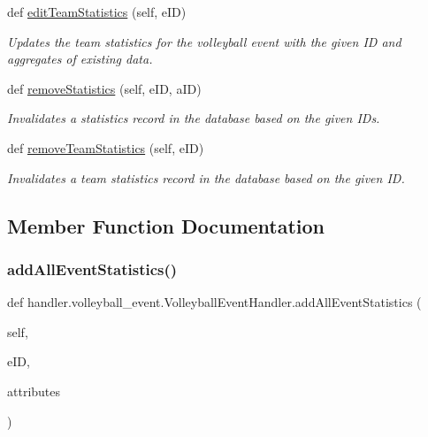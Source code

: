 \begin{DoxyCompactItemize}
def \hyperlink{classhandler_1_1volleyball__event_1_1_volleyball_event_handler_a8808ffe14fac6db3f9dbd22962085dd8}{edit\+Team\+Statistics} (self, e\+ID)
\begin{DoxyCompactList}\small\item\em Updates the team statistics for the volleyball event with the given ID and aggregates of existing data. \end{DoxyCompactList}\item 
def \hyperlink{classhandler_1_1volleyball__event_1_1_volleyball_event_handler_ad4060f95466b8c84dbcaf4e63507b9ea}{remove\+Statistics} (self, e\+ID, a\+ID)
\begin{DoxyCompactList}\small\item\em Invalidates a statistics record in the database based on the given I\+Ds. \end{DoxyCompactList}\item 
def \hyperlink{classhandler_1_1volleyball__event_1_1_volleyball_event_handler_a2212d7eb1e37729e936fb6c228b06b83}{remove\+Team\+Statistics} (self, e\+ID)
\begin{DoxyCompactList}\small\item\em Invalidates a team statistics record in the database based on the given ID. \end{DoxyCompactList}\end{DoxyCompactItemize}


\subsection{Member Function Documentation}
\mbox{\label{classhandler_1_1volleyball__event_1_1_volleyball_event_handler_a734329834b9e58469acd4f53b8a74504}} 
\subsubsection{\texorpdfstring{add\+All\+Event\+Statistics()}{addAllEventStatistics()}}
{\footnotesize\ttfamily def handler.\+volleyball\+\_\+event.\+Volleyball\+Event\+Handler.\+add\+All\+Event\+Statistics (\begin{DoxyParamCaption}\item[{}]{self,  }\item[{}]{e\+ID,  }\item[{}]{attributes }\end{DoxyParamCaption})}



